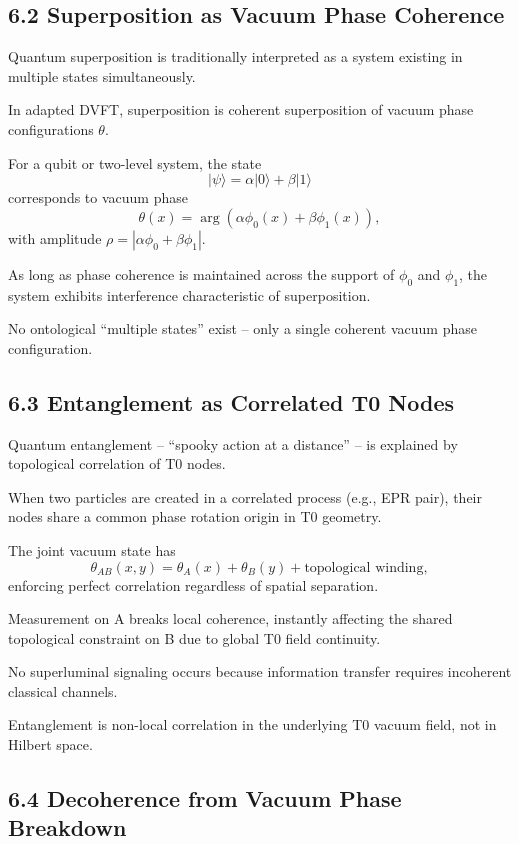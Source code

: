 	\subsection{6.2 Superposition as Vacuum Phase Coherence}
	
	Quantum superposition is traditionally interpreted as a system existing in multiple states simultaneously.
	
	In adapted DVFT, superposition is coherent superposition of vacuum phase configurations $\theta$.
	
	For a qubit or two-level system, the state
	\[
	|\psi\rangle = \alpha |0\rangle + \beta |1\rangle
	\]
	corresponds to vacuum phase
	\[
	\theta(x) = \arg(\alpha \phi_0(x) + \beta \phi_1(x)),
	\]
	with amplitude $\rho = |\alpha \phi_0 + \beta \phi_1|$.
	
	As long as phase coherence is maintained across the support of $\phi_0$ and $\phi_1$, the system exhibits interference characteristic of superposition.
	
	No ontological ``multiple states'' exist – only a single coherent vacuum phase configuration.
	
	\subsection{6.3 Entanglement as Correlated T0 Nodes}
	
	Quantum entanglement – ``spooky action at a distance'' – is explained by topological correlation of T0 nodes.
	
	When two particles are created in a correlated process (e.g., EPR pair), their nodes share a common phase rotation origin in T0 geometry.
	
	The joint vacuum state has
	\[
	\theta_{AB}(x,y) = \theta_A(x) + \theta_B(y) + \text{topological winding},
	\]
	enforcing perfect correlation regardless of spatial separation.
	
	Measurement on A breaks local coherence, instantly affecting the shared topological constraint on B due to global T0 field continuity.
	
	No superluminal signaling occurs because information transfer requires incoherent classical channels.
	
	Entanglement is non-local correlation in the underlying T0 vacuum field, not in Hilbert space.
	
	\subsection{6.4 Decoherence from Vacuum Phase Breakdown}
	

